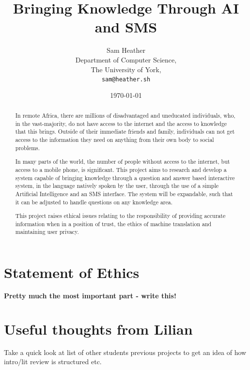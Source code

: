 \documentclass{article}
\begin{document}
\title{Bringing Knowledge Through AI and SMS}
\author{Sam Heather\\
  Department of Computer Science,\\
  The University of York,\\
  \texttt{sam@heather.sh}}
\date{\today}
\maketitle

\newpage

\begin{abstract}


In remote Africa, there are millions of disadvantaged and uneducated individuals, who, in the vast-majority, do not have access to the internet and the access to knowledge that this brings.  Outside of their immediate friends and family, individuals can not get access to the information they need on anything from their own body to social problems.

In many parts of the world, the number of people without access to the internet, but access to a mobile phone, is significant.  This project aims to research and develop a system capable of bringing knowledge through a question and answer based interactive system, in the language natively spoken by the user, through the use of a simple Artificial Intelligence and an SMS interface.  The system will be expandable, such that it can be adjusted to handle questions on any knowledge area.

This project raises ethical issues relating to the responsibility of providing accurate information when in a position of trust, the ethics of machine translation and maintaining user privacy.
\end{abstract}

\newpage
\tableofcontents
\newpage
\listoffigures
\newpage
\listoftables
\newpage

\section*{Statement of Ethics}
{\bf Pretty much the most important part - write this!}

\newpage
\section{Useful thoughts from Lilian}
Take a quick look at list of other students previous projects to get an idea of how intro/lit review is structured etc.
\end{document}
